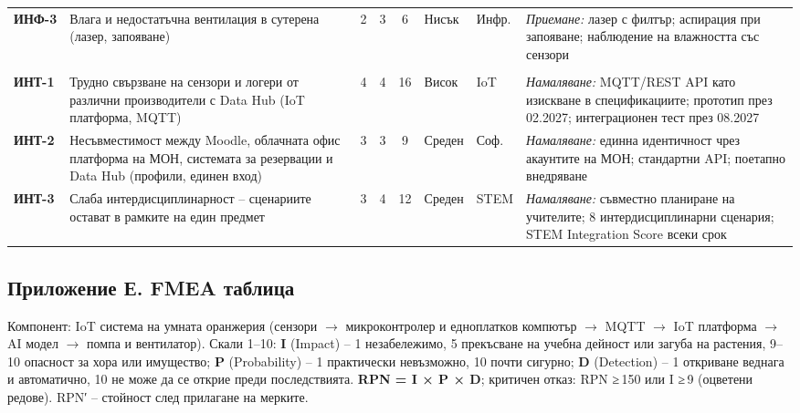 \documentclass[11pt,a4paper]{article}
\begin{document}
\begin{xltabular}{\textwidth}{@{}>{\bfseries}l>{\raggedright\arraybackslash{}\hsize}X ccc >{\centering\arraybackslash}p{1.12cm}>{\raggedright\arraybackslash}p{1.05cm}>{\raggedright\arraybackslash{}\hsize}X@{}}
ИНФ-3 & Влага и недостатъчна вентилация в сутерена (лазер, запояване) & 2 & 3 & 6 & Нисък & Инфр. & \textit{Приемане:} лазер с филтър; аспирация при запояване; наблюдение на влажността със сензори\\
\\*
ИНТ-1 & Трудно свързване на сензори и логери от различни производители с Data Hub (IoT платформа, MQTT) & 4 & 4 & 16 & Висок & IoT & \textit{Намаляване:} MQTT/REST API като изискване в спецификациите; прототип през 02.2027; интеграционен тест през 08.2027\\
ИНТ-2 & Несъвместимост между Moodle, облачната офис платформа на МОН, системата за резервации и Data Hub (профили, единен вход) & 3 & 3 & 9 & Среден & Соф. & \textit{Намаляване:} единна идентичност чрез акаунтите на МОН; стандартни API; поетапно внедряване\\
ИНТ-3 & Слаба интердисциплинарност – сценариите остават в рамките на един предмет & 3 & 4 & 12 & Среден & STEM & \textit{Намаляване:} съвместно планиране на учителите; 8 интердисциплинарни сценария; STEM Integration Score всеки срок\\
\end{xltabular}
\endgroup

\subsection*{Приложение Е. FMEA таблица}

Компонент: IoT система на умната оранжерия (сензори $\to$ микроконтролер и едноплатков компютър $\to$ MQTT $\to$ IoT платформа $\to$ AI модел $\to$ помпа и вентилатор). Скали 1–10: \textbf{I} (Impact) – 1 незабележимо, 5 прекъсване на учебна дейност или загуба на растения, 9–10 опасност за хора или имущество; \textbf{P} (Probability) – 1 практически невъзможно, 10 почти сигурно; \textbf{D} (Detection) – 1 откриване веднага и автоматично, 10 не може да се открие преди последствията. \textbf{RPN = I × P × D}; критичен отказ: RPN ≥\,150 или I ≥\,9 (оцветени редове). RPN′ – стойност след прилагане на мерките.
\end{document}
